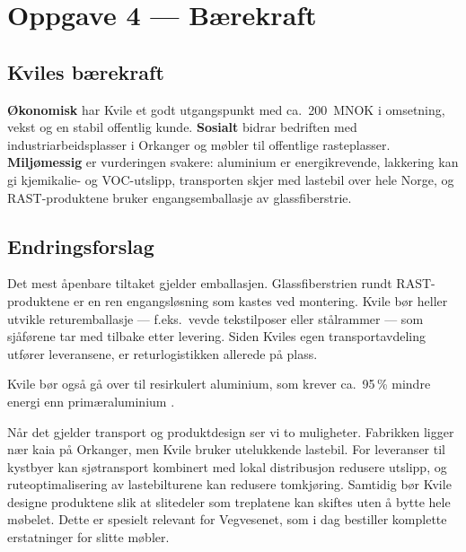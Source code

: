\section*{Oppgave 4 — Bærekraft}
\setcounter{section}{4}

\setcounter{subsection}{0}

\subsection{Kviles bærekraft}

\textbf{Økonomisk} har Kvile et godt utgangspunkt med ca.\ 200~MNOK i omsetning, vekst og en stabil offentlig kunde. \textbf{Sosialt} bidrar bedriften med industriarbeidsplasser i Orkanger og møbler til offentlige rasteplasser. \textbf{Miljømessig} er vurderingen svakere: aluminium er energikrevende, lakkering kan gi kjemikalie- og VOC-utslipp, transporten skjer med lastebil over hele Norge, og RAST-produktene bruker engangsemballasje av glassfiberstrie.

\subsection{Endringsforslag}

Det mest åpenbare tiltaket gjelder emballasjen. Glassfiberstrien rundt RAST-produktene er en ren engangsløsning som kastes ved montering. Kvile bør heller utvikle returemballasje — f.eks.\ vevde tekstilposer eller stålrammer — som sjåførene tar med tilbake etter levering. Siden Kviles egen transportavdeling utfører leveransene, er returlogistikken allerede på plass.

Kvile bør også gå over til resirkulert aluminium, som krever ca.\ 95\,\% mindre energi enn primæraluminium \parencite{iai2025}.

Når det gjelder transport og produktdesign ser vi to muligheter. Fabrikken ligger nær kaia på Orkanger, men Kvile bruker utelukkende lastebil. For leveranser til kystbyer kan sjøtransport kombinert med lokal distribusjon redusere utslipp, og ruteoptimalisering av lastebilturene kan redusere tomkjøring. Samtidig bør Kvile designe produktene slik at slitedeler som treplatene kan skiftes uten å bytte hele møbelet. Dette er spesielt relevant for Vegvesenet, som i dag bestiller komplette erstatninger for slitte møbler.

